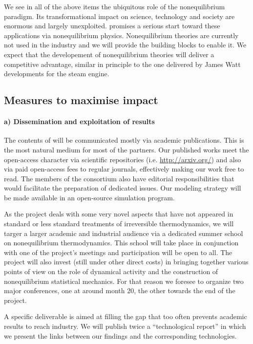 We see in all of the above items the ubiquitous role of the nonequilibrium paradigm. Its
transformational impact on science, technology and society are enormous and largely
unexploited. \TheProject promises a serious start toward these applications via
nonequilibrium physics.
%
Nonequilibrium theories are currently not used in the industry and we will provide the
building blocks to enable it. We expect that the developement of nonequilibrium theories
will deliver a competitive advantage, similar in principle to the one delivered by James
Watt developments for the steam engine.

\subsection{Measures to maximise impact}

\paragraph{a) Dissemination and exploitation of results}

The contents of \TheProject will be communicated mostly via academic publications. This is
the most natural medium for most of the partners.
%
Our published works meet the open-access character via scientific repositories
(i.e. \url{http://arxiv.org/}) and also via paid open-access fees to regular journals,
effectively making our work free to read.
%
The members of the consortium also have editorial responsibilities that would facilitate the
preparation of dedicated issues.
%
Our modeling strategy will be made available in an open-source simulation program.

As the project deals with some very novel aspects that have not appeared in standard or less
standard treatments of irreversible thermodynamics, we will targer a larger academic and
industrial audience via a dedicated summer school on nonequilibrium thermodynamics. This
school will take place in conjunction with one of the project's meetings and participation
will be open to all.
%
The project will also invest (still under other direct costs) in bringing together various
points of view on the role of dynamical activity and the construction of nonequilibrium
statistical mechanics. For that reason we foresee to organize two major conferences, one at
around month 20, the other towards the end of the project.

A specific deliverable is aimed at filling the gap that too often prevents academic results
to reach industry. We will publish twice a ``technological report'' in which we present the
links between our findings and the corresponding technologies.

